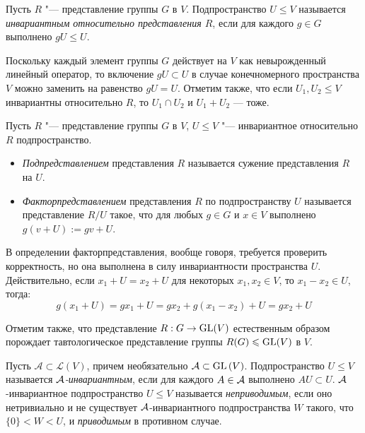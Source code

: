 \begin{definition}
	Пусть $R$ "--- представление группы $G$ в $V$. Подпространство $U \le V$ называется \textit{инвариантным относительно представления $R$}, если для каждого $g \in G$ выполнено $gU \le U$.
\end{definition}

\begin{note}
	Поскольку каждый элемент группы $G$ действует на $V$ как невырожденный линейный оператор, то включение $gU \subset U$ в случае конечномерного пространства $V$ можно заменить на равенство $gU = U$. Отметим также, что если $U_1, U_2 \le V$ инвариантны относительно $R$, то $U_1 \cap U_2$ и $U_1 + U_2$ --- тоже.
\end{note}

\begin{definition}
	Пусть $R$ "--- представление группы $G$ в $V$, $U \le V$ "--- инвариантное относительно $R$ подпространство.
	\begin{itemize}
		\item \textit{Подпредставлением} представления $R$ называется сужение представления $R$ на $U$.
		\item \textit{Факторпредставлением} представления $R$ по подпространству $U$ называется представление $R / U$ такое, что для любых $g \in G$ и $x \in V$ выполнено $g(v + U) := gv + U$.
	\end{itemize}
\end{definition}

\begin{note}
	В определении факторпредставления, вообще говоря, требуется проверить корректность, но она выполнена в силу инвариантности пространства $U$. Действительно, если $x_1 + U = x_2 + U$ для некоторых $x_1, x_2 \in V$, то $x_1 - x_2 \in U$, тогда:
	\[g(x_1 + U) = gx_1 + U = gx_2 + g(x_1 - x_2) + U = gx_2 + U\]
	
	Отметим также, что представление $R : G \to \operatorname{GL}(V)$ естественным образом порождает тавтологическое представление группы $R(G) \leqslant \operatorname{GL}(V)$ в $V$.
\end{note}

\begin{definition}
	Пусть $\mathcal A \subset \mathcal{L}(V)$, причем необязательно $\mathcal A \subset \operatorname{GL}{(V)}$. Подпространство $U \le V$ называется \textit{$\mathcal A$-инвариантным}, если для каждого $A \in \mathcal A$ выполнено $AU \subset U$. $\mathcal A$-инвариантное подпространство $U \le V$ называется \textit{неприводимым}, если оно нетривиально и не существует $\mathcal A$-инвариантного подпространства $W$ такого, что $\{0\} < W < U$, и \textit{приводимым} в противном случае.
\end{definition}


